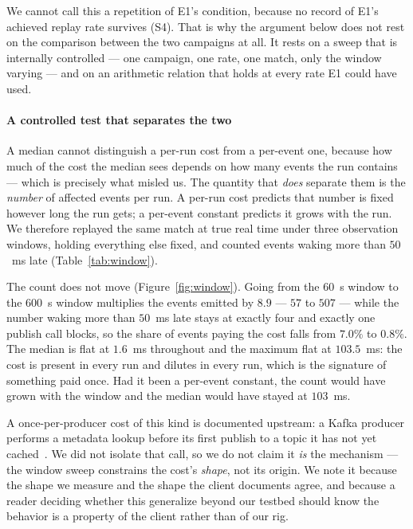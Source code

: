 \documentclass[10pt,journal,onecolumn]{IEEEtran}
\newcommand{\kafka}{Kafka}
\begin{document}
We cannot call this a repetition of E1's condition, because no record of E1's achieved replay rate survives (S4). That is why the argument below does not rest on the
comparison between the two campaigns at all. It rests on a sweep that is internally controlled
--- one campaign, one rate, one match, only the window varying --- and on an arithmetic
relation that holds at every rate E1 could have used.

\paragraph{A controlled test that separates the two} A median cannot distinguish a per-run cost
from a per-event one, because how much of the cost the median sees depends on how many events the
run contains --- which is precisely what misled us. The quantity that \emph{does} separate them is
the \emph{number} of affected events per run. A per-run cost predicts that number is fixed however
long the run gets; a per-event constant predicts it grows with the run. We therefore replayed the
same match at true real time under three observation windows, holding everything else fixed, and
counted events waking more than $50$~ms late (Table~\ref{tab:window}).

The count does not move (Figure~\ref{fig:window}). Going from the $60$~s window to the $600$~s
window multiplies the events emitted by $8.9$ --- $57$ to $507$ --- while the number waking more
than $50$~ms late stays at exactly four and exactly one publish call blocks, so the share of events
paying the cost falls from $7.0\%$ to $0.8\%$. The median is flat at $1.6$~ms throughout and the maximum flat at
$103.5$~ms: the cost is present in every run and dilutes in every run, which is the signature of
something paid once. Had it been a per-event constant, the count would have grown with the window
and the median would have stayed at $103$~ms.

A once-per-producer cost of this kind is documented upstream: a \kafka{} producer performs a
metadata lookup before its first publish to a topic it has not yet cached~\cite{kafka2020kip526}.
We did not isolate that call, so we do not claim it \emph{is} the mechanism --- the window sweep
constrains the cost's \emph{shape}, not its origin. We note it because the shape we measure and
the shape the client documents agree, and because a reader deciding whether this generalize
beyond our testbed should know the behavior is a property of the client rather than of our rig.
\end{document}
